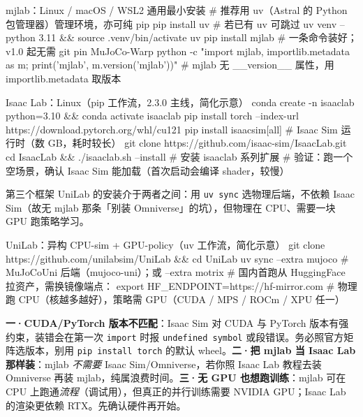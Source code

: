 \begin{codebox}[bash]{mjlab：Linux / macOS / WSL2 通用最小安装}
# 推荐用 uv（Astral 的 Python 包管理器）管理环境，亦可纯 pip
pip install uv                      # 若已有 uv 可跳过
uv venv --python 3.11 && source .venv/bin/activate
uv pip install mjlab               # 一条命令装好；v1.0 起无需 git pin MuJoCo-Warp
python -c "import mjlab, importlib.metadata as m; print('mjlab', m.version('mjlab'))"  # mjlab 无 __version__ 属性，用 importlib.metadata 取版本
\end{codebox}

\begin{codebox}[bash]{Isaac Lab：Linux（pip 工作流，2.3.0 主线，简化示意）}
conda create -n isaaclab python=3.10 && conda activate isaaclab
pip install torch --index-url https://download.pytorch.org/whl/cu121
pip install isaacsim[all]          # Isaac Sim 运行时（数 GB，耗时较长）
git clone https://github.com/isaac-sim/IsaacLab.git
cd IsaacLab && ./isaaclab.sh --install   # 安装 isaaclab 系列扩展
# 验证：跑一个空场景，确认 Isaac Sim 能加载（首次启动会编译 shader，较慢）
\end{codebox}

第三个框架 UniLab 的安装介于两者之间：用 \verb|uv sync| 选物理后端，不依赖 Isaac Sim（故无 mjlab 那条「别装 Omniverse」的坑），但物理在 CPU、需要一块 GPU 跑策略学习。

\begin{codebox}[bash]{UniLab：异构 CPU-sim + GPU-policy（uv 工作流，简化示意）}
git clone https://github.com/unilabsim/UniLab && cd UniLab
uv sync --extra mujoco              # MuJoCoUni 后端（mujoco-uni）；或 --extra motrix
# 国内首跑从 HuggingFace 拉资产，需换镜像端点：
export HF_ENDPOINT=https://hf-mirror.com
# 物理跑 CPU（核越多越好），策略需 GPU（CUDA / MPS / ROCm / XPU 任一）
\end{codebox}

\begin{pitfall}[安装阶段三个最常见的「卡住」]
\textbf{一·CUDA/PyTorch 版本不匹配}：Isaac Sim 对 CUDA 与 PyTorch 版本有强约束，装错会在第一次 \verb|import| 时报 \verb|undefined symbol| 或段错误。务必照官方矩阵选版本，别用 \verb|pip install torch| 的默认 wheel。\textbf{二·把 mjlab 当 Isaac Lab 那样装}：mjlab \emph{不需要} Isaac Sim/Omniverse，若你照 Isaac Lab 教程去装 Omniverse 再装 mjlab，纯属浪费时间。\textbf{三·无 GPU 也想跑训练}：mjlab 可在 CPU 上跑通\emph{流程}（调试用），但真正的并行训练需要 NVIDIA GPU；Isaac Lab 的渲染更依赖 RTX。先确认硬件再开始。
\end{pitfall}

